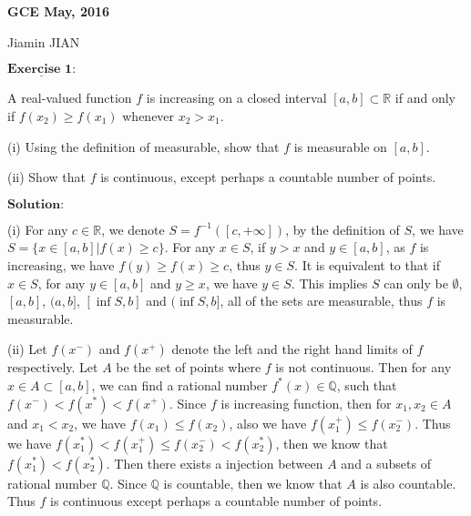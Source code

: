 \documentclass[12pt,a4paper]{ctexart}
\begin{document}
\begin{center}
\textbf{ GCE May, 2016}
\vspace{8pt}

Jiamin JIAN
\end{center}

\vspace{12pt}

$\underline{\textbf{Exercise 1:}}$

A real-valued function $f$ is increasing on a closed interval $[a, b] \subset \mathbb{R}$ if and only if $f(x_{2}) \geq f(x_{1})$ whenever $x_{2} > x_{1}$.

(i) Using the definition of measurable, show that $f$ is measurable on $[a, b]$.

(ii) Show that $f$ is continuous, except perhaps a countable number of points.

\vspace{8pt}

$\textbf{Solution:}$

(i) For any $c \in \mathbb{R}$, we denote $S = f^{-1} ([c, +\infty])$, by the definition of $S$, we have $S = \{x \in [a, b] | f(x) \geq c \}$. For any $x \in S$, if $y > x$ and $y \in [a, b]$, as $f$ is increasing, we have $f(y) \geq f(x) \geq c$, thus $y \in S$. It is equivalent to that if $x \in S$, for any $y \in [a, b]$ and $y \geq x$, we have $y \in S$. This implies $S$ can only be $\emptyset$, $[a, b]$, $(a, b]$, $[\inf S, b]$ and $(\inf S, b]$, all of the sets are measurable, thus $f$ is measurable.

\vspace{4pt}

(ii) Let $f(x^{-})$ and $f(x^{+})$ denote the left and the right hand limits of $f$ respectively. Let $A$
be the set of points where $f$ is not continuous. Then for any $x \in A \subset [a, b]$, we can find a rational number $f^{*}(x) \in \mathbb{Q}$, such that $f(x^{-}) < f(x^{*}) < f(x^{+})$. Since $f$ is increasing function, then for $x_{1}, x_{2} \in A$ and $x_{1} < x_{2}$, we have $f(x_{1}) \leq f(x_{2})$, also we have $f(x_{1}^{+}) \leq f(x_{2}^{-})$. Thus we have $f(x_{1}^{*}) < f(x_{1}^{+}) \leq f(x_{2}^{-}) < f(x_{2}^{*})$, then we know that $f(x_{1}^{*}) < f(x_{2}^{*})$. Then there exists a injection between $A$ and a subsets of rational number $\mathbb{Q}$. Since $\mathbb{Q}$ is countable, then we know that $A$ is also countable. Thus $f$ is continuous except perhaps a countable number of points.


\newpage
\end{document}
